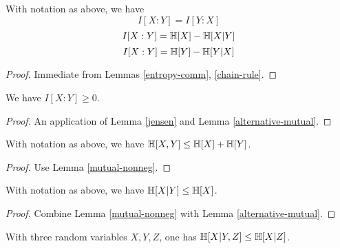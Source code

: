 \begin{lemma}
  \label{alternative-mutual}
  \leanok
  With notation as above, we have
  $$  I[X : Y] = I[Y:X]$$
  $$  I[X : Y] = \mathbb{H}[X] - \mathbb{H}[X|Y]$$
  $$  I[X : Y] = \mathbb{H}[Y] - \mathbb{H}[Y|X]$$
\end{lemma}

\begin{proof}
  \leanok
  Immediate from Lemmas \ref{entropy-comm}, \ref{chain-rule}.
\end{proof}

\begin{lemma}
  \label{mutual-nonneg}
  \leanok
  We have $I[X:Y] \geq 0$.
\end{lemma}

\begin{proof}   An application of Lemma \ref{jensen} and Lemma \ref{alternative-mutual}.
\end{proof}

\begin{corollary}[Subadditivity]
  \label{subadditive}
  \leanok
  With notation as above, we have $\mathbb{H}[X,Y] \leq \mathbb{H}[X] + \mathbb{H}[Y]$.
\end{corollary}

\begin{proof}
  \leanok
  Use Lemma \ref{mutual-nonneg}.
\end{proof}

\begin{corollary}
  \label{cond-reduce}
  \leanok
  With notation as above, we have $\mathbb{H}[X|Y] \leq \mathbb{H}[X]$.
\end{corollary}
\begin{proof}
  \leanok
  Combine Lemma \ref{mutual-nonneg} with Lemma \ref{alternative-mutual}.
\end{proof}

\begin{corollary}[Submodularity]\label{submodularity}
  \leanok
  With three random variables $X,Y,Z$, one has $\mathbb{H}[X|Y,Z] \leq \mathbb{H}[X|Z]$.
\end{corollary}

